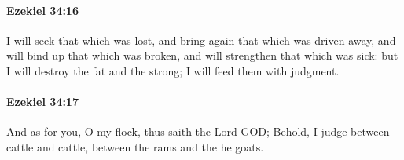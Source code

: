 		\paragraph{Ezekiel 34:16} %
			\label{EZEKIEL-34-16}

			I will seek that which was lost, and bring again that which was driven away, and will bind up that which was broken, and will strengthen that which was sick: but I will destroy the fat and the strong; I will feed them with judgment.


		\paragraph{Ezekiel 34:17} %
			\label{EZEKIEL-34-17}

			And as for you, O my flock, thus saith the Lord GOD; Behold, I judge between cattle and cattle, between the rams and the he goats.


